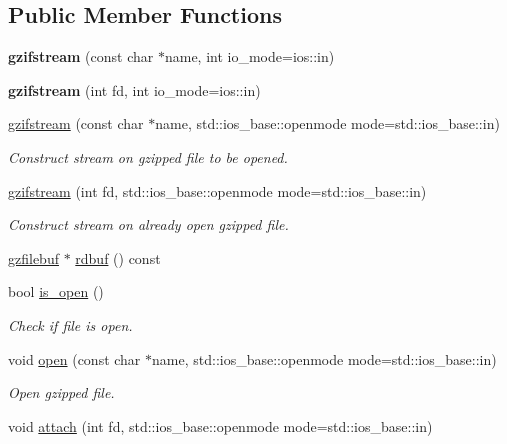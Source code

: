 \subsection*{Public Member Functions}
\begin{DoxyCompactItemize}
\item 
\mbox{\label{classgzifstream_a56e464903ee517fb3377f9d8a2977694}} 
{\bfseries gzifstream} (const char $\ast$name, int io\+\_\+mode=ios\+::in)
\item 
\mbox{\label{classgzifstream_ab1380a28c963c7b3b85dc63d0d11cc1a}} 
{\bfseries gzifstream} (int fd, int io\+\_\+mode=ios\+::in)
\item 
\hyperlink{classgzifstream_a90f6e0eea83b7ce3c64f755b51b5b011}{gzifstream} (const char $\ast$name, std\+::ios\+\_\+base\+::openmode mode=std\+::ios\+\_\+base\+::in)
\begin{DoxyCompactList}\small\item\em Construct stream on gzipped file to be opened. \end{DoxyCompactList}\item 
\hyperlink{classgzifstream_aa5ab9dcc3ab35bffe781f4c49239826e}{gzifstream} (int fd, std\+::ios\+\_\+base\+::openmode mode=std\+::ios\+\_\+base\+::in)
\begin{DoxyCompactList}\small\item\em Construct stream on already open gzipped file. \end{DoxyCompactList}\item 
\hyperlink{classgzfilebuf}{gzfilebuf} $\ast$ \hyperlink{classgzifstream_a1c5a0ab4f99f8d8e3406af7bfd82b133}{rdbuf} () const
\item 
bool \hyperlink{classgzifstream_a8e9de13b311b698ef0ccc276b71c7941}{is\+\_\+open} ()
\begin{DoxyCompactList}\small\item\em Check if file is open. \end{DoxyCompactList}\item 
void \hyperlink{classgzifstream_a8105f9300d36dafbe8b10c204583f5a1}{open} (const char $\ast$name, std\+::ios\+\_\+base\+::openmode mode=std\+::ios\+\_\+base\+::in)
\begin{DoxyCompactList}\small\item\em Open gzipped file. \end{DoxyCompactList}\item 
void \hyperlink{classgzifstream_a24aff901c395acbdaddb7878f4ddb7aa}{attach} (int fd, std\+::ios\+\_\+base\+::openmode mode=std\+::ios\+\_\+base\+::in)

\end{DoxyCompactItemize}
